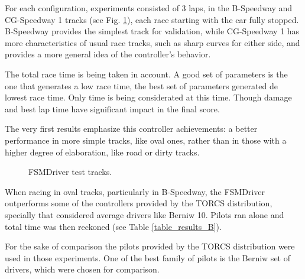 For each configuration, experiments consisted of 3 laps, in the B-Speedway and 
CG-Speedway 1 tracks (see Fig. \ref{fig:tracks}), each race starting with the car fully stopped. B-Speedway provides the simplest track for validation, while CG-Speedway 1
has more characteristics of usual race tracks, such as sharp curves for either side,
and provides a more general idea of the controller's behavior.

The total race time is being taken in account. A good set of parameters is the one that generates a low race time, the best set of parameters generated de lowest race time. Only time is being considerated at this time. Though damage and best lap time have significant impact in the final score.

The very first results emphasize this controller achievements: a better performance in more simple tracks, like oval ones, rather than in those with a higher degree of elaboration, like road or dirty tracks.


\begin{figure}[!t] 
\centering 
{}
\hfill
{}
\caption{FSMDriver test tracks.} 
\label{fig:tracks} 
\end{figure} 

When racing in oval tracks, particularly in B-Speedway, the FSMDriver outperforms 
some of the controllers provided by the TORCS distribution, specially that considered average drivers like Berniw 10. Pilots ran alone and total time was then reckoned (see Table \ref{table_results_B}).

For the sake of comparison the pilots provided by the TORCS distribution were used in those experiments. One of the best family of pilots is the Berniw set of drivers, which were chosen for comparison. 

